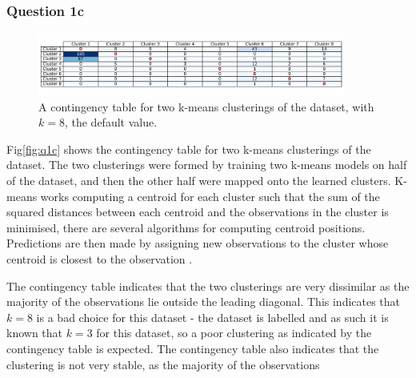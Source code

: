 \subsubsection{Question 1c}\label{subsubsec:q1c}
    \begin{figure}[htb]
    \centering
    \includegraphics[width=0.9\textwidth]{./figures/q1c}
    \caption{A contingency table for two k-means clusterings of the  dataset, with $k=8$,
        the default  value.}
    \label{fig:q1c}
    \end{figure}

    Fig\eqref{fig:q1c} shows the contingency table for two k-means clusterings of the dataset.
    The two clusterings were formed by training two k-means models on half of the dataset, and then the other half were
    mapped onto the learned clusters.
    K-means works computing a centroid for each cluster such that the sum of the squared distances between each centroid
    and the observations in the cluster is minimised, there are several algorithms for computing centroid positions.
    Predictions are then made by assigning new observations to the cluster whose centroid is closest to the
    observation \cite{sklearn-k-means}.

    The contingency table indicates that the two clusterings are very dissimilar as the majority of the observations
    lie outside the leading diagonal.
    This indicates that $k=8$ is a bad choice for this dataset - the dataset is labelled and as such it is known
    that $k=3$ for this dataset, so a poor clustering as indicated by the contingency table is expected.
    The contingency table also indicates that the clustering is not very stable, as the majority of the observations
